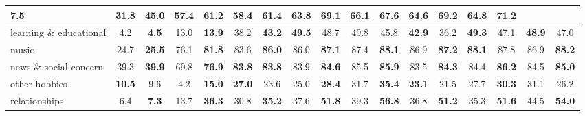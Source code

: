 \begin{table}[t]
{\begin{tabular}{|l|cc|cc|cc|cc|cc|cc|cc|cc|}
  \textbf{7.5} &
  \multicolumn{1}{c|}{31.8} &
  \textbf{45.0} &
  \multicolumn{1}{c|}{57.4} &
  \textbf{61.2} &
  \multicolumn{1}{c|}{58.4} &
  \textbf{61.4} &
  \multicolumn{1}{c|}{63.8} &
  \textbf{69.1} &
  \multicolumn{1}{c|}{66.1} &
  \textbf{67.6} &
  \multicolumn{1}{c|}{64.6} &
  \textbf{69.2} &
  \multicolumn{1}{c|}{64.8} &
  71.2 \\ \hline
learning \& educational &
  \multicolumn{1}{c|}{4.2} &
  \textbf{4.5} &
  \multicolumn{1}{c|}{13.0} &
  \textbf{13.9} &
  \multicolumn{1}{c|}{38.2} &
  \textbf{43.2} &
  \multicolumn{1}{c|}{\textbf{49.5}} &
  48.7 &
  \multicolumn{1}{c|}{49.8} &
  45.8 &
  \multicolumn{1}{c|}{\textbf{42.9}} &
  36.2 &
  \multicolumn{1}{c|}{\textbf{49.3}} &
  47.1 &
  \multicolumn{1}{c|}{\textbf{48.9}} &
  47.0 \\ \hline
music &
  \multicolumn{1}{c|}{24.7} &
  \textbf{25.5} &
  \multicolumn{1}{c|}{76.1} &
  \textbf{81.8} &
  \multicolumn{1}{c|}{83.6} &
  \textbf{86.0} &
  \multicolumn{1}{c|}{86.0} &
  \textbf{87.1} &
  \multicolumn{1}{c|}{87.4} &
  \textbf{88.1} &
  \multicolumn{1}{c|}{86.9} &
  \textbf{87.2} &
  \multicolumn{1}{c|}{\textbf{88.1}} &
  87.8 &
  \multicolumn{1}{c|}{86.9} &
  \textbf{88.2} \\ \hline
news \& social concern &
  \multicolumn{1}{c|}{39.3} &
  \textbf{39.9} &
  \multicolumn{1}{c|}{69.8} &
  \textbf{76.9} &
  \multicolumn{1}{c|}{\textbf{83.8}} &
  \textbf{83.8} &
  \multicolumn{1}{c|}{83.9} &
  \textbf{84.6} &
  \multicolumn{1}{c|}{85.5} &
  \textbf{85.9} &
  \multicolumn{1}{c|}{83.5} &
  \textbf{84.3} &
  \multicolumn{1}{c|}{84.4} &
  \textbf{86.2} &
  \multicolumn{1}{c|}{84.5} &
  \textbf{85.0} \\ \hline
other hobbies &
  \multicolumn{1}{c|}{\textbf{10.5}} &
  9.6 &
  \multicolumn{1}{c|}{4.2} &
  \textbf{15.0} &
  \multicolumn{1}{c|}{\textbf{27.0}} &
  23.6 &
  \multicolumn{1}{c|}{25.0} &
  \textbf{28.4} &
  \multicolumn{1}{c|}{31.7} &
  \textbf{35.4} &
  \multicolumn{1}{c|}{\textbf{23.1}} &
  21.5 &
  \multicolumn{1}{c|}{27.7} &
  \textbf{30.3} &
  \multicolumn{1}{c|}{31.1} &
  26.2 \\ \hline
relationships &
  \multicolumn{1}{c|}{6.4} &
  \textbf{7.3} &
  \multicolumn{1}{c|}{13.7} &
  \textbf{36.3} &
  \multicolumn{1}{c|}{30.8} &
  \textbf{35.2} &
  \multicolumn{1}{c|}{37.6} &
  \textbf{51.8} &
  \multicolumn{1}{c|}{39.3} &
  \textbf{56.8} &
  \multicolumn{1}{c|}{36.8} &
  \textbf{51.2} &
  \multicolumn{1}{c|}{35.3} &
  \textbf{51.6} &
  \multicolumn{1}{c|}{44.5} &
  \textbf{54.0} \\ \hline

\end{tabular}}
\end{table}
